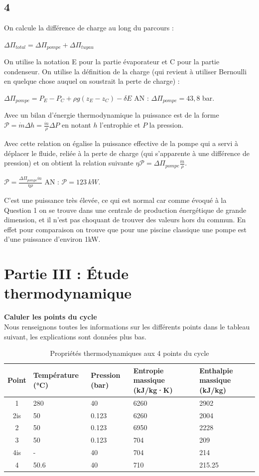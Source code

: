 \documentclass[12pt]{article}
\begin{document}
\subsection*{4}
On calcule la différence de charge au long du parcours :

$\Delta \Pi_{total} = \Delta \Pi_{pompe} + \Delta \Pi_{tuyau}$

On utilise la notation E pour la partie évaporateur et C pour la partie condenseur.
On utilise la définition de la charge (qui revient à utiliser Bernoulli en quelque chose auquel on soustrait la perte de charge) :

$\boxed{\Delta \Pi_{pompe} = P_E - P_C + \rho g(z_E-z_C) - \delta E}$ AN : $\Delta \Pi_{pompe} = 43,8$ bar.

Avec un bilan d'énergie thermodynamique la puissance est de la forme $\mathcal P = \dot m \Delta h = \frac{\dot m}{\rho} \Delta P$ en notant $h$ l'entrophie et $P$ la pression.

Avec cette relation on égalise la puissance effective de la pompe qui a servi à déplacer le fluide, reliée à la perte de charge (qui s'apparente à une différence de pression) et on obtient la relation suivante $\eta \mathcal P = \Delta \Pi_{pompe} \frac{\dot m}{\rho}$.

$\boxed{\mathcal P = \frac{\Delta \Pi_{pompe} \dot m }{\eta \rho}}$ AN : $\mathcal P = 123 \ kW$.

C'est une puissance très élevée, ce qui est normal car comme évoqué à la Question 1 on se trouve dans une centrale de production énergétique de grande dimension, et il n'est pas choquant de trouver des valeurs hors du commun. En effet pour comparaison on trouve que pour une piscine classique une pompe est d'une puissance d'environ 1kW.

\section*{Partie III : Étude thermodynamique}

\textbf{Caluler les points du cycle}
\\
Nous renseignons toutes les informations sur les différents points dans le tableau suivant, les explications sont données plus bas.

\begin{table}[h!]
\centering
\begin{tabularx}{\textwidth}{|c|X|X|X|X|}
\hline
\textbf{Point} & \textbf{Température (°C)} & \textbf{Pression (bar)} & \textbf{Entropie massique (kJ/kg·K)} & \textbf{Enthalpie massique (kJ/kg)} \\
\hline
1 & 280 & 40 & 6260 & 2902 \\
\hline
2is & 50 & 0.123 & 6260 & 2004 \\
\hline
2 & 50 & 0.123 & 6950 & 2228 \\
\hline
3 & 50 & 0.123 & 704 & 209 \\
\hline
4is & - & 40 & 704 & 214 \\
\hline
4 & 50.6 & 40 & 710 & 215.25 \\
\hline
\end{tabularx}
\caption{Propriétés thermodynamiques aux 4 points du cycle}
\label{tab:points_thermo}
\end{table}
\end{document}
